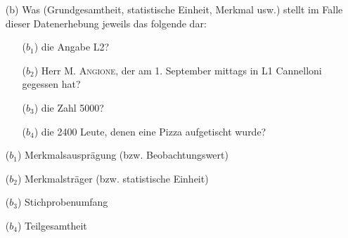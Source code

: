 \begin{task}
    \begin{enumerate}
        \item[(b)] Was (Grundgesamtheit, statistische Einheit, Merkmal usw.) stellt im Falle dieser Datenerhebung jeweils das folgende dar:
        \begin{enumerate}
            \item[($b_1$)] die Angabe L2?
            \item[($b_2$)] Herr \textsc{M. Angione}, der am 1. September mittags in L1 Cannelloni gegessen hat?
            \item[($b_3$)] die Zahl 5000?
            \item[($b_4$)] die 2400 Leute, denen eine Pizza aufgetischt wurde?
        \end{enumerate}
    \end{enumerate}
\end{task}

\begin{enumerate}
    \item[($b_1$)] Merkmalsausprägung (bzw. Beobachtungswert)
    \item[($b_2$)] Merkmalsträger (bzw. statistische Einheit)
    \item[($b_3$)] Stichprobenumfang
    \item[($b_4$)] Teilgesamtheit
\end{enumerate}
